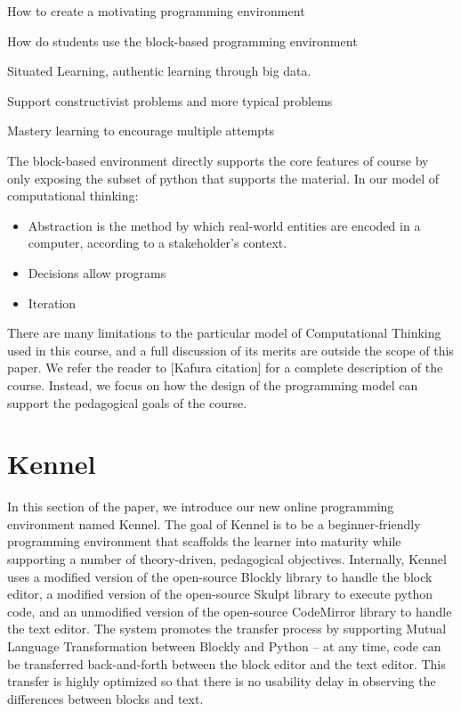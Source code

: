 \documentclass{sig-alternate}
\begin{document}
How to create a motivating programming environment

How do students use the block-based programming environment

Situated Learning, authentic learning through big data.

Support constructivist problems and more typical problems

Mastery learning to encourage multiple attempts

The block-based environment directly supports the core features of course by only exposing the subset of python that supports the material. In our model of computational thinking:
\begin{itemize}
	\item Abstraction is the method by which real-world entities are encoded in a computer, according to a stakeholder's context.
	\item Decisions allow programs
	\item Iteration
\end{itemize}

There are many limitations to the particular model of Computational Thinking used in this course, and a full discussion of its merits are outside the scope of this paper. We refer the reader to [Kafura citation] for a complete description of the course. Instead, we focus on how the design of the programming model can support the pedagogical goals of the course.

\section{Kennel}

In this section of the paper, we introduce our new online programming environment named Kennel.
The goal of Kennel is to be a beginner-friendly programming environment that scaffolds the learner into maturity while supporting a number of theory-driven, pedagogical objectives.
Internally, Kennel uses a modified version of the open-source Blockly library to handle the block editor, a modified version of the open-source Skulpt library to execute python code, and an unmodified version of the open-source CodeMirror library to handle the text editor.
The system promotes the transfer process by supporting Mutual Language Transformation between Blockly and Python -- at any time, code can be transferred back-and-forth between the block editor and the text editor.
This transfer is highly optimized so that there is no usability delay in observing the differences between blocks and text.
\end{document}
